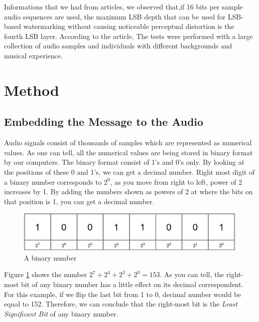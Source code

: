 \documentclass[twocolumns]{IEEEtran}
\begin{document}
	
	Informations that we had from articles, we observed that,if
	16 bits per sample audio sequences are used,  the maximum LSB depth that
	can be used for LSB-based watermarking without causing
	noticeable perceptual distortion is the fourth LSB layer. According to the article, The tests
	were performed with a large collection of audio samples
	and individuals with different backgrounds and musical
	experience.
	
	\section{Method}
	\subsection{Embedding the Message to the Audio}
	Audio signals consist of thousands of samples which are represented as numerical values. As one can tell, all the numerical values are being stored in binary format by our computers. The binary format consist of 1's and 0's only. By looking at the positions of these 0 and 1's, we can get a decimal number. Right most digit of a binary number corresponds to $2^0$, as you move from right to left, power of 2 increases by 1. By adding the numbers shown as powers of 2 at where the bits on that position is 1, you can get a decimal number.
	\begin{figure}[h]
		\centering
		\includegraphics[scale=.5]{binary_num.eps}
		\caption{A binary number}
		\label{fig:binary}
	\end{figure}

	Figure \ref{fig:binary} shows the number $2^7 + 2^4 + 2^3 + 2^0 = 153$. As you can tell, the right-most bit of any binary number has a little effect on its decimal correspondent. For this example, if we flip the last bit from 1 to 0, decimal number would be equal to 152. Therefore, we can conclude that the right-most bit is the \textit{Least Significant Bit} of any binary number.
	
\end{document}
